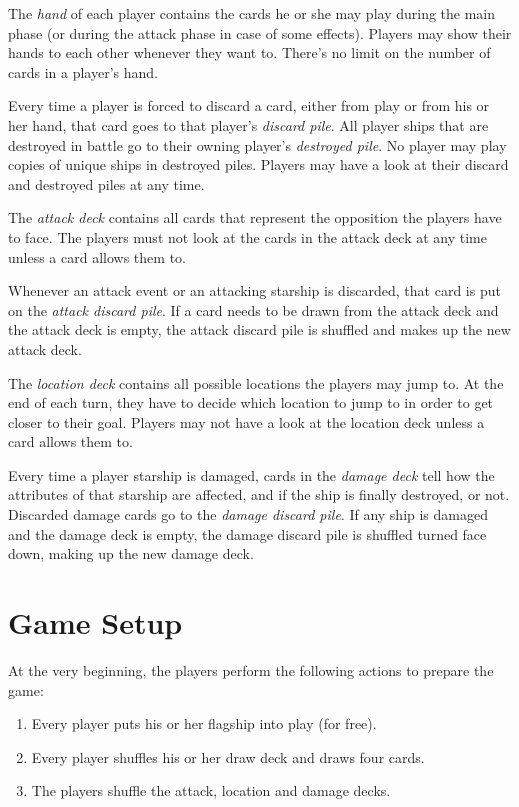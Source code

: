 \documentclass[11pt, a4paper]{article}
\begin{document}
The \emph{hand} of each player contains the cards he or she may play during the
main phase (or during the attack phase in case of some effects). Players may
show their hands to each other whenever they want to. There's no limit on the
number of cards in a player's hand.

Every time a player is forced to discard a card, either from play or from his or
her hand, that card goes to that player's \emph{discard pile}. All player ships
that are destroyed in battle go to their owning player's \emph{destroyed pile}.
No player may play copies of unique ships in destroyed piles. Players may have a
look at their discard and destroyed piles at any time.

The \emph{attack deck} contains all cards that represent the opposition the
players have to face. The players must not look at the cards in the attack deck
at any time unless a card allows them to.

Whenever an attack event or an attacking starship is discarded, that card is put
on the \emph{attack discard pile}. If a card needs to be drawn from the attack
deck and the attack deck is empty, the attack discard pile is shuffled and makes
up the new attack deck.

The \emph{location deck} contains all possible locations the players may jump
to. At the end of each turn, they have to decide which location to jump to in
order to get closer to their goal. Players may not have a look at the location
deck unless a card allows them to.

Every time a player starship is damaged, cards in the \emph{damage deck} tell
how the attributes of that starship are affected, and if the ship is finally
destroyed, or not. Discarded damage cards go to the \emph{damage discard pile}.
If any ship is damaged and the damage deck is empty, the damage discard pile
is shuffled turned face down, making up the new damage deck.

\section{Game Setup}

At the very beginning, the players perform the following actions to prepare the
game:

\begin{enumerate}
  \item Every player puts his or her flagship into play (for free).
  \item Every player shuffles his or her draw deck and draws four cards.
  \item The players shuffle the attack, location and damage decks.
\end{enumerate}
\end{document}
